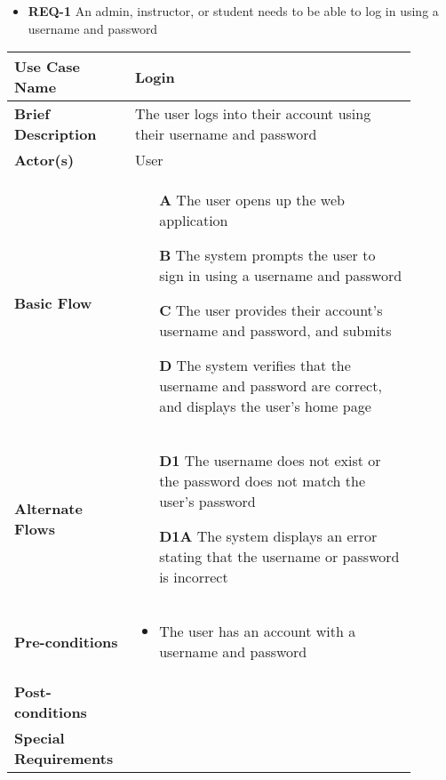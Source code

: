 \documentclass{article}
\begin{document}
\begin{itemize}
  \item \textbf{REQ-1} An admin, instructor, or student needs to be able to log in using a username and password
\end{itemize}

\vspace{0.1in}

\begin{tabular}{| p{0.25\linewidth} | p{0.65\linewidth} |}
  \hline
  \textbf{Use Case Name} & Login \\
  \hline
  \textbf{Brief Description} & The user logs into their account using their username and password \\
  \hline
  \textbf{Actor(s)} & User \\
  \hline
  \textbf{Basic Flow} & \begin{itemize}
    \item[\textbf{A}] The user opens up the web application
    \item[\textbf{B}] The system prompts the user to sign in using a username and password
    \item[\textbf{C}] The user provides their account's username and password, and submits
    \item[\textbf{D}] The system verifies that the username and password are correct, and displays the user's home page
  \end{itemize}\\
  \hline
  \textbf{Alternate Flows} & \begin{itemize}
    \item[\textbf{D1}] The username does not exist or the password does not match the user's password
    \item[\textbf{D1A}] The system displays an error stating that the username or password is incorrect
  \end{itemize} \\
  \hline
  \textbf{Pre-conditions} & \begin{itemize}
    \item The user has an account with a username and password
  \end{itemize} \\
  \hline
  \textbf{Post-conditions} & \\
  \hline
  \textbf{Special Requirements} &  \\
  \hline
\end{tabular}
\end{document}
